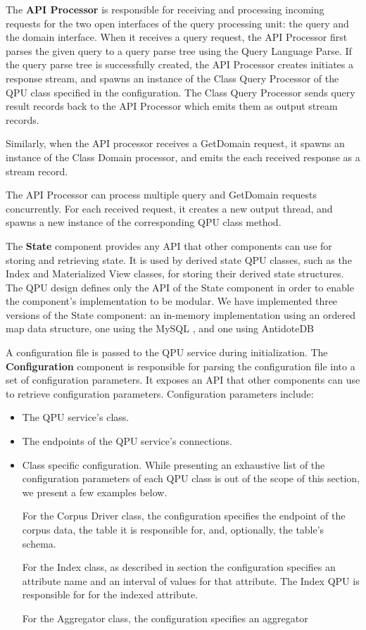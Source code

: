 The \textbf{API Processor} is responsible for receiving and processing incoming requests for the two open interfaces of
the query processing unit:
the query and the domain interface.
When it receives a query request,
the API Processor first parses the given query to a query parse tree  using the Query Language Parse.
If the query parse tree is successfully created, the API Processor creates initiates a response stream,
and spawns an instance of the Class Query Processor of the QPU class specified in the configuration.
The Class Query Processor sends query result records back to the API Processor which emits them as output stream records.

Similarly, when the API processor receives a GetDomain request,
it spawns an instance of the Class Domain processor, and emits the each received response as a stream record.

The API Processor can process multiple query and GetDomain requests concurrently.
For each received request, it creates a new output thread, and spawns a new instance of the corresponding QPU class method.


The \textbf{State} component provides any API that other components can use for storing and retrieving state.
It is used by derived state QPU classes, such as the Index and Materialized View classes, for storing their
derived state structures.
The QPU design defines only the API of the State component in order to enable the component's implementation to be modular.
We have implemented three versions of the State component: an in-memory implementation using an ordered map data structure,
one using the MySQL , and one using AntidoteDB 


A configuration file is passed to the QPU service during initialization.
The \textbf{Configuration} component is responsible for parsing the configuration file into a set of configuration parameters.
It exposes an API that other components can use to retrieve configuration parameters.
Configuration parameters include:

\begin{itemize}
  \item The QPU service's class.
  \item The endpoints of the QPU service's connections.
  \item Class specific configuration.
  While presenting an exhaustive list of the configuration parameters of each QPU class is out of the scope of this
  section, we present a few examples below.

  For the Corpus Driver class, the configuration specifies the endpoint of the corpus data,
  the table it is responsible for, and, optionally, the table's schema.

  For the Index class, as described in section  the configuration specifies an attribute name
  and an interval of values for that attribute.
  The Index QPU is responsible for  for the indexed attribute.

  For the Aggregator class, the configuration specifies an aggregator
\end{itemize}



